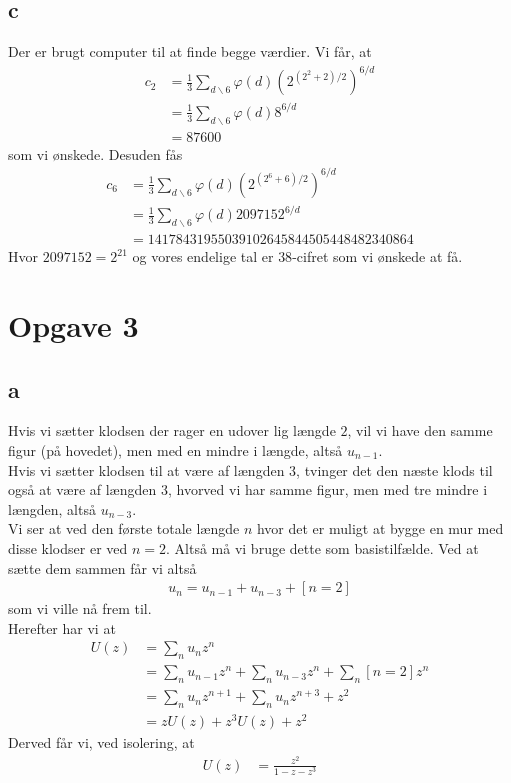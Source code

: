 \documentclass[12pt]{article}
\begin{document}
\subsection*{c}
Der er brugt computer til at finde begge værdier. Vi får, at 
\begin{align*}
c_2&=\frac{1}{3}\sum_{d\backslash 6} \varphi(d)\left( 2^{(2^2+2)/2}\right)^{6/d} \\
&=\frac{1}{3}\sum_{d\backslash 6} \varphi(d) 8^{6/d} \\
&=87600
\end{align*}
som vi ønskede. Desuden fås
\begin{align*}
c_6&=\frac{1}{3}\sum_{d\backslash 6} \varphi(d)\left( 2^{(2^6+6)/2}\right)^{6/d} \\
&=\frac{1}{3}\sum_{d\backslash 6} \varphi(d) 2097152^{6/d} \\
&=14178431955039102645844505448482340864
\end{align*}
Hvor $2097152=2^{21}$ og vores endelige tal er $38$-cifret som vi ønskede at få.

\section*{Opgave 3}
\subsection*{a}
Hvis vi sætter klodsen der rager en udover lig længde $2$, vil vi have den samme figur (på hovedet), men med en mindre i længde, altså $u_{n-1}$.\\
Hvis vi sætter klodsen til at være af længden $3$, tvinger det den næste klods til også at være af længden $3$, hvorved vi har samme figur, men med tre mindre i længden, altså $u_{n-3}$. \\
Vi ser at ved den første totale længde $n$ hvor det er muligt at bygge en mur med disse klodser er ved $n=2$. Altså må vi bruge dette som basistilfælde. Ved at sætte dem sammen får vi altså
\begin{align*}
u_n=u_{n-1}+u_{n-3}+[n=2]
\end{align*}
som vi ville nå frem til.\\
Herefter har vi at
\begin{align*}
U(z)&=\sum_n u_nz^n \\
&=\sum_n u_{n-1}z^n+\sum_n u_{n-3}z^n+\sum_n [n=2]z^n \\
&=\sum_n u_{n}z^{n+1}+\sum_n u_{n}z^{n+3}+z^2 \\
&=zU(z)+z^3U(z)+z^2
\end{align*}
Derved får vi, ved isolering, at
\begin{align*}
U(z)&=\frac{z^2}{1-z-z^3}
\end{align*}
\end{document}
